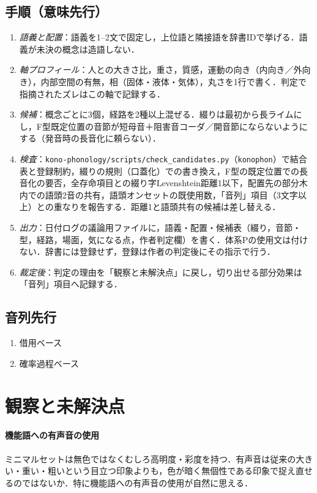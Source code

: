 \documentclass[../../main-detail.tex]{subfiles}
\begin{document}
\subsection{手順（意味先行）}
\begin{enumerate}
    \item \emph{語義と配置}：語義を1--2文で固定し，上位語と隣接語を辞書IDで挙げる．語義が未決の概念は造語しない．
    \item \emph{軸プロフィール}：人との大きさ比，重さ，質感，運動の向き（内向き／外向き），内部空間の有無，相（固体・液体・気体），丸さを1行で書く．判定で指摘されたズレはこの軸で記録する．
    \item \emph{候補}：概念ごとに3個，経路を2種以上混ぜる．綴りは最初から長ライムにし，F型既定位置の音節が短母音＋阻害音コーダ／開音節にならないようにする（発音時の長音化に頼らない）．
    \item \emph{検査}：\texttt{kono-phonology/scripts/check\_candidates.py}（\texttt{konophon}）で結合表と登録制約，綴りの規則（口蓋化）での書き換え，F型の既定位置での長音化の要否，全存命項目との綴り字Levenshtein距離1以下，配置先の部分木内での語頭2音の共有，語頭オンセットの既使用数，「音列」項目（3文字以上）との重なりを報告する．距離1と語頭共有の候補は差し替える．
    \item \emph{出力}：日付ログの議論用ファイルに，語義・配置・候補表（綴り，音節・型，経路，場面，気になる点，作者判定欄）を書く．体系Pの使用文は付けない．辞書には登録せず，登録は作者の判定後にその指示で行う．
    \item \emph{裁定後}：判定の理由を「観察と未解決点」に戻し，切り出せる部分効果は「音列」項目へ記録する．
\end{enumerate}

\subsection{音列先行}
\begin{enumerate}
    \item 借用ベース
    \item 確率過程ベース
\end{enumerate}

\section{観察と未解決点}
\paragraph{機能語への有声音の使用} ミニマルセットは無色ではなくむしろ高明度・彩度を持つ．有声音は従来の大きい・重い・粗いという目立つ印象よりも，色が暗く無個性である印象で捉え直せるのではないか．特に機能語への有声音の使用が自然に思える．
\end{document}
